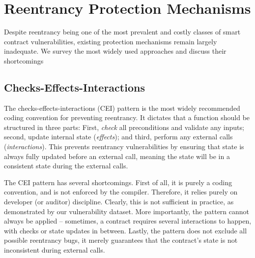 



\section{Reentrancy Protection Mechanisms}

Despite reentrancy being one of the most prevalent and costly classes of smart contract vulnerabilities, existing protection mechanisms remain largely inadequate. We survey the most widely used approaches and discuss their shortcomings

\subsection{Checks-Effects-Interactions}
The checks-effects-interactions (CEI) pattern \cite{cei} is the most widely recommended coding convention for preventing reentrancy. It dictates that a function should be structured in three parts: First, \textit{check} all preconditions and validate any inputs; second, update internal state (\textit{effects}); and third, perform any external calls (\textit{interactions}). This prevents reentrancy vulnerabilities by ensuring that state is always fully updated before an external call, meaning the state will be in a consistent state during the external calls.
\par
The CEI pattern has several shortcomings. First of all, it is purely a coding convention, and is not enforced by the compiler. Therefore, it relies purely on developer (or auditor) discipline. Clearly, this is not sufficient in practice, as demonstrated by our vulnerability dataset. More importantly, the pattern cannot always be applied -- sometimes, a contract requires several interactions to happen, with checks or state updates in between. Lastly, the pattern does not exclude all possible reentrancy bugs, it merely guarantees that the contract's state is not inconsistent during external calls.

